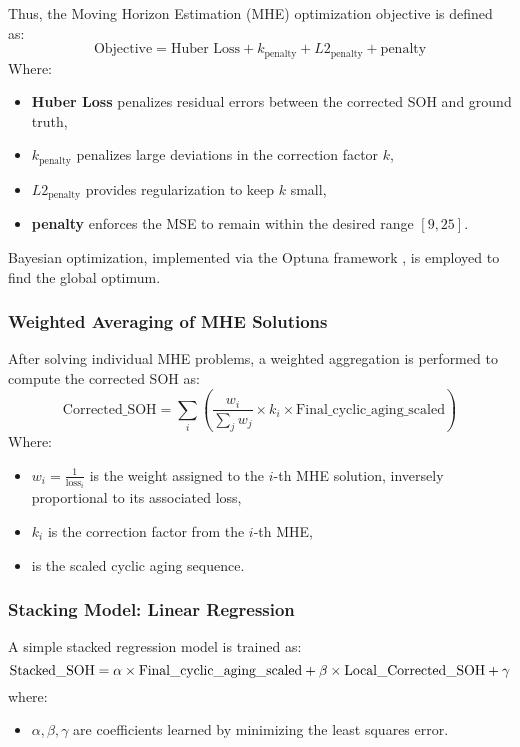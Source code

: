 Thus, the Moving Horizon Estimation (MHE) optimization objective is defined as:
\begin{equation}
\text{Objective} = \text{Huber Loss} + k_{\text{penalty}} + L2_{\text{penalty}} + \text{penalty}
\end{equation}
Where:
\begin{itemize}
    \item \textbf{Huber Loss} penalizes residual errors between the corrected SOH and ground truth,
    \item \( k_{\text{penalty}} \) penalizes large deviations in the correction factor \(k\),
    \item \( L2_{\text{penalty}} \) provides regularization to keep \(k\) small,
    \item \textbf{penalty} enforces the MSE to remain within the desired range \([9, 25]\).
\end{itemize}

Bayesian optimization, implemented via the Optuna framework \cite{akiba2019optunanextgenerationhyperparameteroptimization}, is employed to find the global optimum.

\subsubsection{Weighted Averaging of MHE Solutions}
After solving individual MHE problems, a weighted aggregation is performed to compute the corrected SOH as:
\begin{equation}
\text{Corrected\_SOH} = \sum_i \left( \frac{w_i}{\sum_j w_j} \times k_i \times \text{Final\_cyclic\_aging\_scaled} \right)
\end{equation}
Where:
\begin{itemize}
    \item \( w_i = \frac{1}{\text{loss}_i} \) is the weight assigned to the \(i\)-th MHE solution, inversely proportional to its associated loss,
    \item \( k_i \) is the correction factor from the \(i\)-th MHE,
    \item {} is the scaled cyclic aging sequence.
\end{itemize}

\subsubsection{Stacking Model: Linear Regression}
A simple stacked regression model is trained as:
\begin{equation}
\text{Stacked\_SOH} =\\ \alpha \times \text{Final\_cyclic\_aging\_scaled} + \beta \times \text{Local\_Corrected\_SOH} + \gamma
\end{equation}
where:
\begin{itemize}
    \item \( \alpha, \beta, \gamma \) are coefficients learned by minimizing the least squares error.
\end{itemize}

